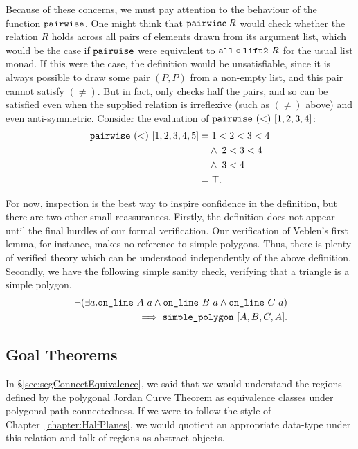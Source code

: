 Because of these concerns, we must pay attention to the behaviour of the function $\texttt{pairwise}$. One might think that $\texttt{pairwise}\, R$ would check whether the relation $R$ holds across all pairs of elements drawn from its argument list, which would be the case if $\texttt{pairwise}$ were equivalent to $\texttt{all} \circ \texttt{lift2}\ R$ for the usual list monad. If this were the case, the definition would be unsatisfiable, since it is always possible to draw some pair $(P,P)$ from a non-empty list, and this pair cannot satisfy $(\neq)$. But in fact,  only checks half the pairs, and so can be satisfied even when the supplied relation is irreflexive (such as $(\neq)$ above) and even anti-symmetric. Consider the evaluation of $\texttt{pairwise}\ (<)\ [1,2,3,4]$:
\begin{align*}
  \texttt{pairwise}\ (<)\ [1,2,3,4,5] &= 1 < 2 < 3 < 4 \\
  &\quad\wedge\; 2 < 3 < 4 \\
  &\quad\wedge\; 3 < 4\\
  & = \top.
\end{align*}

For now, inspection is the best way to inspire confidence in the definition, but there are two other small reassurances. Firstly, the definition does not appear until the final hurdles of our formal verification. Our verification of Veblen's first lemma, for instance, makes no reference to simple polygons. Thus, there is plenty of verified theory which can be understood independently of the above definition. Secondly, we have the following simple sanity check, verifying that a triangle is a simple polygon.
\begin{equation*}
  \begin{split}
    \; \neg(\exists a.\texttt{on\_line}\ A\ a\wedge \texttt{on\_line}\ B\ a\wedge \texttt{on\_line}\ C\ a) \\
    \implies \texttt{simple\_polygon}\ [A,B,C,A].
  \end{split}
\end{equation*}

\subsection{Goal Theorems}
In \S\ref{sec:segConnectEquivalence}, we said that we would understand the regions defined by the polygonal Jordan Curve Theorem as equivalence classes under polygonal path-connectedness. If we were to follow the style of Chapter~\ref{chapter:HalfPlanes}, we would quotient an appropriate data-type under this relation and talk of regions as abstract objects.
 
